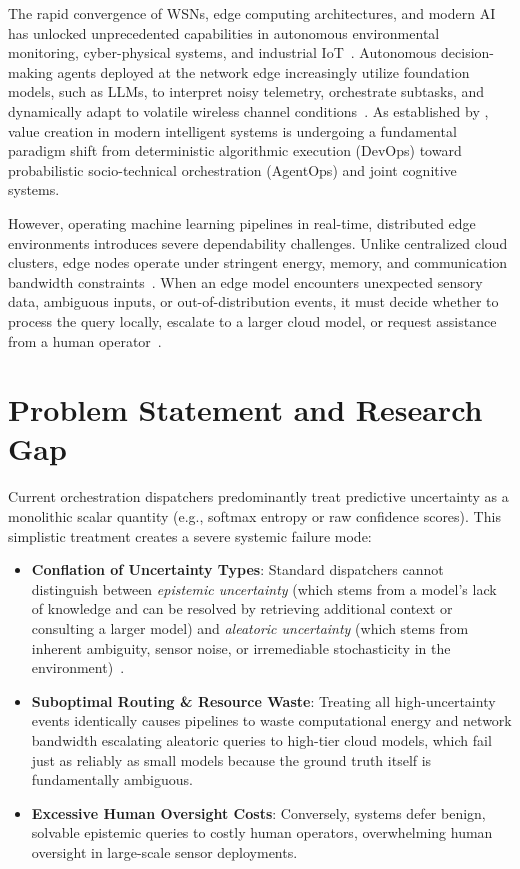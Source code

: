 The rapid convergence of \acp{WSN}, edge computing architectures, and modern \ac{AI} has unlocked unprecedented capabilities in autonomous environmental monitoring, cyber-physical systems, and industrial IoT~\cite{buttyan2010application,piotrowski2006public}. Autonomous decision-making agents deployed at the network edge increasingly utilize foundation models, such as \acp{LLM}, to interpret noisy telemetry, orchestrate subtasks, and dynamically adapt to volatile wireless channel conditions~\cite{pechlivanidou2022survey,shi2016edge,mao2017survey}. As established by \textcite{meissner2026human}, value creation in modern intelligent systems is undergoing a fundamental paradigm shift from deterministic algorithmic execution (DevOps) toward probabilistic socio-technical orchestration (AgentOps) and joint cognitive systems.

However, operating machine learning pipelines in real-time, distributed edge environments introduces severe dependability challenges. Unlike centralized cloud clusters, edge nodes operate under stringent energy, memory, and communication bandwidth constraints~\cite{piotrowski2006public}. When an edge model encounters unexpected sensory data, ambiguous inputs, or out-of-distribution events, it must decide whether to process the query locally, escalate to a larger cloud model, or request assistance from a human operator~\cite{kendall2017uncertainties}.

\section{Problem Statement and Research Gap}
\label{sec:intro_problem}

Current orchestration dispatchers predominantly treat predictive uncertainty as a monolithic scalar quantity (e.g., softmax entropy or raw confidence scores). This simplistic treatment creates a severe systemic failure mode:
\begin{itemize}
    \item \textbf{Conflation of Uncertainty Types}: Standard dispatchers cannot distinguish between \emph{epistemic uncertainty} (which stems from a model's lack of knowledge and can be resolved by retrieving additional context or consulting a larger model) and \emph{aleatoric uncertainty} (which stems from inherent ambiguity, sensor noise, or irremediable stochasticity in the environment)~\cite{kuhn2023semantic,kendall2017uncertainties}.
    \item \textbf{Suboptimal Routing \& Resource Waste}: Treating all high-uncertainty events identically causes pipelines to waste computational energy and network bandwidth escalating aleatoric queries to high-tier cloud models, which fail just as reliably as small models because the ground truth itself is fundamentally ambiguous.
    \item \textbf{Excessive Human Oversight Costs}: Conversely, systems defer benign, solvable epistemic queries to costly human operators, overwhelming human oversight in large-scale sensor deployments.
\end{itemize}

